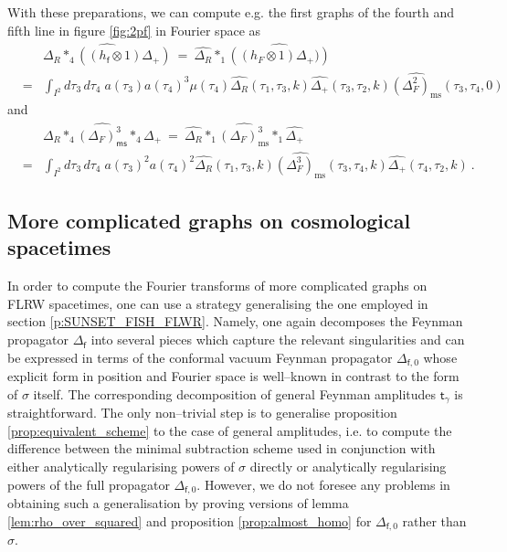 \documentclass[12pt]{book}
\newcommand{\ms}{\mathsf{ms}}
\let\int\int
\newcommand{\fsf}{\mathsf{f}}
\newcommand{\tsf}{\mathsf{t}}
\theoremstyle{break}
\begin{document}
With these preparations, we can compute e.g. the first graphs of the fourth and fifth line in figure \ref{fig:2pf} in Fourier space as
%
\begin{eqnarray*}
&& \widehat{\Delta_R\ast_4((h_\fsf \otimes 1) \Delta_+)} \ = \ \widehat{\Delta_R}\ast_1\widehat{\left((h_F\otimes 1)\Delta_+)\right)} \\
&=& \int_{I^2} d\tau_3\,d\tau_4\; a(\tau_3)a(\tau_4)^3\mu(\tau_4)\widehat{\Delta_R}(\tau_1,\tau_3,k)\widehat{\Delta_+}(\tau_3,\tau_2,k)\widehat{(\Delta^2_F)_\text{ms}}(\tau_3,\tau_4,0)
\end{eqnarray*}
%
and
%
\begin{eqnarray*}
&& \widehat{\Delta_R\ast_4(\Delta_F)^3_\ms\ast_4\Delta_+} \ = \ \widehat{\Delta_R}\ast_1\widehat{(\Delta_F)^3_\text{ms}}\ast_1\widehat{\Delta_+} \\
&=& \int_{I^2} d\tau_3\,d\tau_4\; a(\tau_3)^2a(\tau_4)^2\widehat{\Delta_R}(\tau_1,\tau_3,k)\widehat{(\Delta^3_F)_\text{ms}}(\tau_3,\tau_4,k)\widehat{\Delta_+}(\tau_4,\tau_2,k) \ .
\end{eqnarray*}


\subsection{More complicated graphs on cosmological spacetimes}


In order to compute the Fourier transforms of more complicated graphs on FLRW spacetimes, one can use a strategy generalising the one employed in section \ref{p:SUNSET_FISH_FLWR}. Namely, one again decomposes the Feynman propagator $\Delta_\fsf$ into several pieces which capture the relevant singularities and can be expressed in terms of the conformal vacuum Feynman propagator $\Delta_{\fsf,0}$ whose explicit form in position and Fourier space is well--known in contrast to the form of $\sigma$ itself. The corresponding decomposition of general Feynman amplitudes $\tsf_\gamma$ is straightforward. The only non--trivial step is to generalise proposition \ref{prop:equivalent_scheme} to the case of general amplitudes, i.e. to compute the difference between the minimal subtraction scheme used in conjunction with either analytically regularising powers of $\sigma$ directly or analytically regularising powers of the full propagator $\Delta_{\fsf,0}$. However, we do not foresee any problems in obtaining such a generalisation by proving versions of lemma \ref{lem:rho_over_squared} and proposition \ref{prop:almost_homo} for $\Delta_{\fsf,0}$ rather than $\sigma$.
\end{document}
